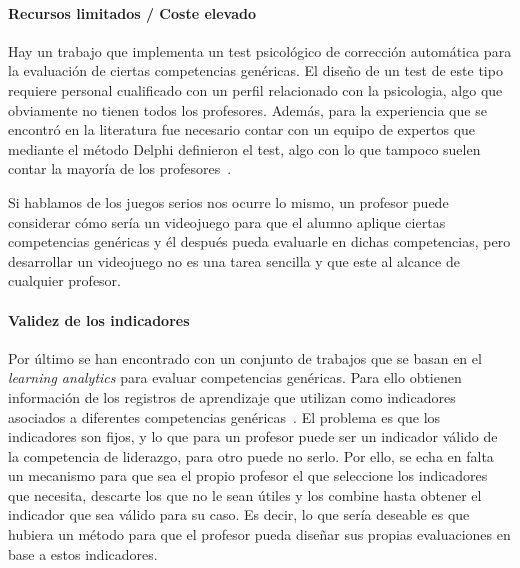 \paragraph*{Recursos limitados / Coste elevado}
Hay un trabajo que implementa un test psicológico de corrección automática para la evaluación de ciertas competencias genéricas. El diseño de un test de este tipo requiere personal cualificado con un perfil relacionado con la psicologia, algo que obviamente no tienen todos los profesores. Además, para la experiencia que se encontró en la literatura fue necesario contar con un equipo de expertos que mediante el método Delphi definieron el test, algo con lo que tampoco suelen contar la mayoría de los profesores~\cite{andre2011formal}.

Si hablamos de los juegos serios nos ocurre lo mismo, un profesor puede considerar cómo sería un videojuego para que el alumno aplique ciertas competencias genéricas y él después pueda evaluarle en dichas competencias, pero desarrollar un videojuego no es una tarea sencilla y que este al alcance de cualquier profesor.

\paragraph*{Validez de los indicadores}
Por último se han encontrado con un conjunto de trabajos que se basan en el \emph{learning analytics} para evaluar competencias genéricas. Para ello obtienen información de los registros de aprendizaje que utilizan como indicadores asociados a diferentes competencias genéricas~\cite{fidalgo:2015,rayon2014web}. El problema es que los indicadores son fijos, y lo que para un profesor puede ser un indicador válido de la competencia de liderazgo, para otro puede no serlo. Por ello, se echa en falta un mecanismo para que sea el propio profesor el que seleccione los indicadores que necesita, descarte los que no le sean útiles y los combine hasta obtener el indicador que sea válido para su caso. Es decir, lo que sería deseable es que hubiera un método para que el profesor pueda diseñar sus propias evaluaciones en base a estos indicadores.




